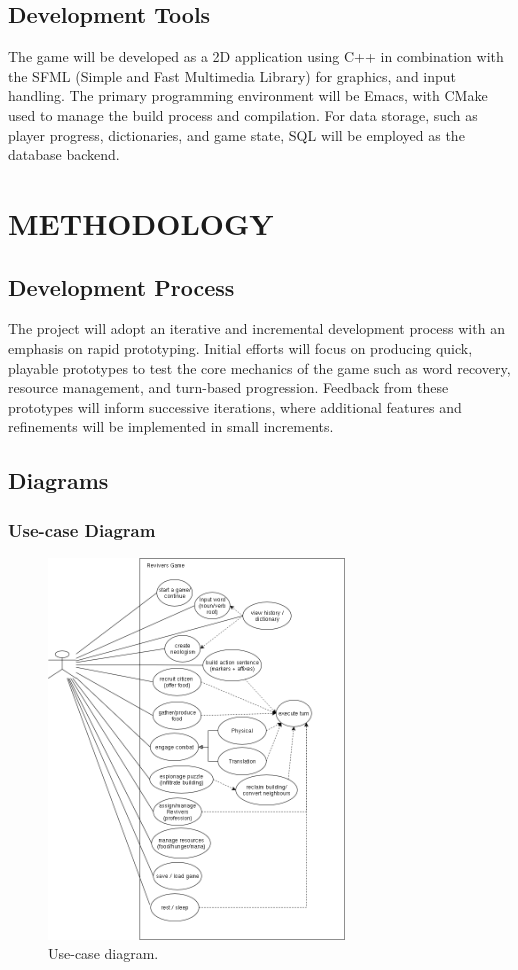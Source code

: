 \documentclass[11pt]{article}
\begin{document}
\subsection{Development Tools}
The game will be developed as a 2D application using C++ in combination with the SFML (Simple and Fast Multimedia Library) for graphics, and input handling.  
The primary programming environment will be Emacs, with CMake used to manage the build process and compilation.  
For data storage, such as player progress, dictionaries, and game state, SQL will be employed as the database backend.


\section{METHODOLOGY}
\subsection{Development Process}
The project will adopt an iterative and incremental development process with an emphasis on rapid prototyping. 
Initial efforts will focus on producing quick, playable prototypes to test the core mechanics of the game such as word recovery, resource management, and turn-based progression. 
Feedback from these prototypes will inform successive iterations, where additional features and refinements will be implemented in small increments.\\

\subsection{Diagrams}
\subsubsection{Use-case Diagram}

\begin{figure}[H]
  \centering
  \includegraphics[width=0.7\textwidth]{images/usecase.png}
  \caption{Use-case diagram.}
  \label{fig:usecase}
\end{figure}
\end{document}
